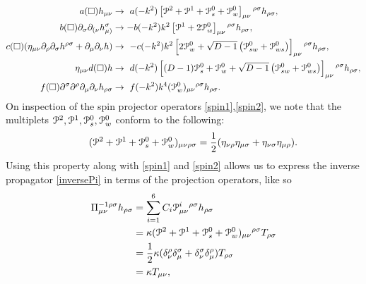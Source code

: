 \begin{align}\nn
a(\Box)h_{\mu \nu}& \rightarrow\ a(-k^2)\left[\mathcal{P}^{2}+\mathcal{P}^{1}+\mathcal{P}_{s}^{0}+\mathcal{P}_{w}^{0}\right]_{\mu\nu}{ }{ }^{\rho\sigma}h_{\rho\sigma},
\\\nn
b(\Box)\partial_{\sigma}\partial_{(\nu}h_{\mu)}^{\sigma} &\rightarrow -b(-k^2)k^2\left[\mathcal{P}^1+2\mathcal{P}_{w}^{0}\right]_{\mu\nu}{ }{ }^{\rho\sigma}h_{\rho\sigma},
\\
c(\Box)(\eta_{\mu \nu}\partial_{\rho}\partial_{\sigma}h^{\rho \sigma}+\partial_{\mu}\partial_{\nu}h
 )&\rightarrow\  -c(-k^2)k^2 \left[2\mathcal{P}_{w}^{0}+\sqrt{D-1}\left(\mathcal{P}_{sw}^{0}+\mathcal{P}_{ws}^{0}\right)
\right]_{\mu\nu}{ }{ }^{\rho\sigma}h_{\rho\sigma},
\nn
\\
 \eta_{\mu \nu} d(\Box)h 
&\rightarrow\  d(-k^2)\left[(D-1)\mathcal{P}_{s}^{0}+\mathcal{P}_{w}^{0}+\sqrt{D-1}\left(\mathcal{P}_{sw}^{0}+\mathcal{P}_{ws}^{0}\right)
\right]_{\mu\nu}{ }{ }^{\rho\sigma}h_{\rho\sigma},
\nn\\ 
f(\Box)\partial^{\sigma}\partial^{\rho}\partial_{\mu}\partial_{\nu}h_{\rho
\sigma} &\rightarrow\ f(-k^2)k^4(\mathcal{P}_{w}^{0})_{\mu\nu}{ }{ }^{\rho\sigma}h_{\rho\sigma}.
\label{proj1}
\end{align}
On inspection of the spin projector operators \eqref{spin1},\eqref{spin2}, we note that the multiplets ${{\cal P}^2,{\cal P}^1,{\cal P}_s^0,{\cal P}_w^0}$ conform to the following:
\[
\qquad ({\cal P}^{2}+{\cal P}^{1}+{\cal P}_{s}^{0}+{\cal P}_{w}^{0})_{\mu\nu\rho\sigma}=\frac{1}{2}(\eta_{\nu\rho}\eta_{\mu\sigma}+\eta_{\nu\sigma}\eta_{\mu\rho})
.\]
Using this property along with \eqref{spin1} and \eqref{spin2} allows us to express the inverse propagator \eqref{inversePi} in terms of the projection operators, like so
\begin{align}
\label{inversepi2}
\Pi_{\mu\nu}^{-1\rho\sigma}h_{\rho\sigma}&	=\sum_{i=1}^{6}C_{i}{\cal P}_{\mu\nu}^{i}{}{}^{\rho\sigma}h_{\rho\sigma}
	\nonumber\\&=\kappa({\cal P}^{2}+{\cal P}^{1}+{\cal P}_{s}^{0}+{\cal P}_{w}^{0})_{\mu\nu}{}{}^{\rho\sigma}T_{\rho\sigma}
	\nonumber\\&=\frac{1}{2}\kappa(\delta_{\nu}^{\rho}\delta_{\mu}^{\sigma}+\delta_{\nu}^{\sigma}\delta_{\mu}^{\rho})T_{\rho\sigma}
	\nonumber\\&=\kappa T_{\mu\nu}
,
\end{align}
